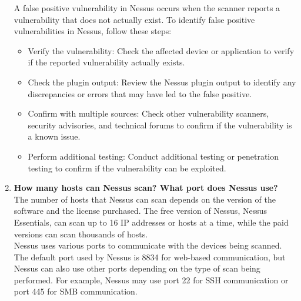 \documentclass[11pt]{article}
\begin{document}
\begin{enumerate}
          A false positive vulnerability in Nessus occurs when the scanner reports a vulnerability that does not actually exist. To identify false positive vulnerabilities in Nessus, follow these steps:

          \begin{itemize}
              \item Verify the vulnerability: Check the affected device or application to verify if the reported vulnerability actually exists.
              \item Check the plugin output: Review the Nessus plugin output to identify any discrepancies or errors that may have led to the false positive.
              \item Confirm with multiple sources: Check other vulnerability scanners, security advisories, and technical forums to confirm if the vulnerability is a known issue.
              \item Perform additional testing: Conduct additional testing or penetration testing to confirm if the vulnerability can be exploited.
          \end{itemize}

    \item \textbf{How many hosts can Nessus scan? What port does Nessus use?}\\

          The number of hosts that Nessus can scan depends on the version of the software and the license purchased. The free version of Nessus, Nessus Essentials, can scan up to 16 IP addresses or hosts at a time, while the paid versions can scan thousands of hosts.\\

          Nessus uses various ports to communicate with the devices being scanned. The default port used by Nessus is 8834 for web-based communication, but Nessus can also use other ports depending on the type of scan being performed. For example, Nessus may use port 22 for SSH communication or port 445 for SMB communication.
\end{enumerate}
\end{document}
